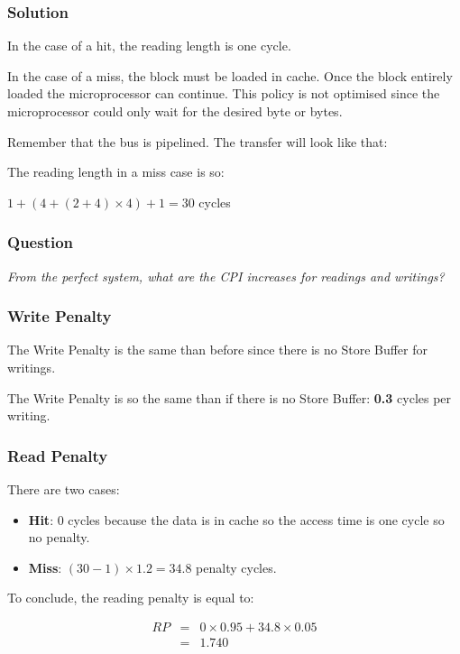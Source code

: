 
\begin{frame}
  \frametitle{Solution}

  In the case of a hit, the reading length is one cycle.

  \-

  In the case of a miss, the block must be loaded in cache. Once the block
  entirely loaded the microprocessor can continue. This policy is not
  optimised since the microprocessor could only wait for the desired byte
  or bytes.

  \-

  Remember that the bus is pipelined. The transfer will look like that:

  \begin{center}
  \end{center}

  The reading length in a miss case is so:

  \-

  \begin{center}
    $1 + (4 + (2 + 4) \times 4) + 1 = 30$ cycles
  \end{center}
\end{frame}


\begin{frame}
  \frametitle{Question}

  \textit{From the perfect system, what are the CPI increases for
    readings and writings?}
\end{frame}


\begin{frame}
  \frametitle{Write Penalty}

  The Write Penalty is the same than before since there is no Store
  Buffer for writings.

  \-

  The Write Penalty is so the same than if there is no Store Buffer:
  \textbf{0.3} cycles per writing.
\end{frame}


\begin{frame}[containsverbatim]
  \frametitle{Read Penalty}

  There are two cases:

  \begin{itemize}
    \item
      \textbf{Hit}: 0 cycles because the data is in cache so the access time
      is one cycle so no penalty.
    \item
      \textbf{Miss}: $(30 - 1) \times 1.2 = 34.8$ penalty cycles.
  \end{itemize}

  To conclude, the reading penalty is equal to:

  \-

  \begin{eqnarray*}
    RP & = & 0 \times 0.95 + 34.8 \times 0.05 \\
       & = & 1.740
  \end{eqnarray*}
\end{frame}

